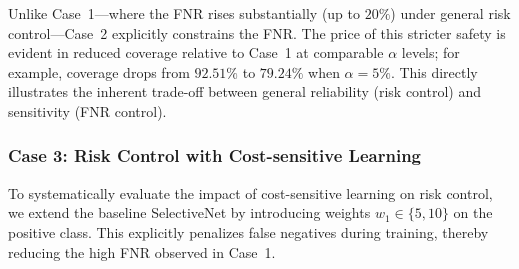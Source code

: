\documentclass[journal,twoside,web]{ieeecolor}
\begin{document}
Unlike Case~1—where the FNR rises substantially (up to $20\%$) under general risk control—Case~2 explicitly constrains the FNR. The price of this stricter safety is evident in reduced coverage relative to Case~1 at comparable $\alpha$ levels; for example, coverage drops from $92.51\%$ to $79.24\%$ when $\alpha=5\%$. This directly illustrates the inherent trade-off between general reliability (risk control) and sensitivity (FNR control).

\subsubsection{\textbf{Case 3: Risk Control with Cost-sensitive Learning}}
\label{sec:case3_results}

To systematically evaluate the impact of cost-sensitive learning on risk control, we extend the baseline SelectiveNet by introducing weights $w_1 \in \{5, 10\}$ on the positive class. This explicitly penalizes false negatives during training, thereby reducing the high FNR observed in Case~1.
\begin{table}[htbp]
    \centering
    \caption{The selective classification performance of Case 3 ($w_{1}=5$ and $w_{1}=10$).}
    \label{tab:case3_results}
\end{table}
\end{document}
